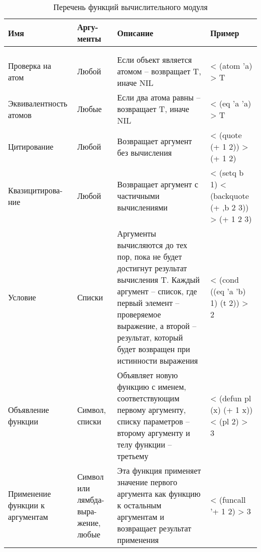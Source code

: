 \begin{xltabular}{\textwidth}{|p{3.6cm}|p{1.8cm}|p{6cm}|X|}
	\caption{Перечень функций вычислительного модуля\label{funcprimeval:table}}\\ \hline
	\centrow Имя & \centrow Аргу- \linebreak менты & \centrow Описание & \centrow Пример \\ \hline
	 &  &  &  \\ \hline
	\endfirsthead
	 &  &  &  \\ \hline
	\finishhead
	Проверка на атом & Любой & Если объект является атомом -- возвращает T, иначе NIL & < (atom 'a) \linebreak > T \\ \hline 
	Эквивалентность атомов & Любые & Если два атома равны -- возвращает T, иначе NIL & < (eq 'a 'a) \linebreak > T \\ \hline 
	Цитирование & Любой & Возвращает аргумент без вычисления & < (quote (+ 1 2)) \linebreak > (+ 1 2) \\ \hline 
	Квазицитирова-\linebreak ние & Любой & Возвращает аргумент с частичными вычислениями & < (setq b 1) \linebreak < (backquote (+ ,b 2 3)) \linebreak > (+ 1 2 3) \\ \hline 
	Условие & Списки & Аргументы вычисляются до тех пор, пока не будет достигнут результат вычисления T. Каждый аргумент -- список, где первый элемент -- проверяемое выражение, а второй -- результат, который будет возвращен при истинности выражения & < (cond ((eq 'a 'b) 1) (t 2)) \linebreak > 2 \\ \hline 
	Объявление функции & Символ, списки & Объявляет новую функцию с именем, соответствующим первому аргументу, списку параметров -- второму аргументу и телу функции -- третьему & < (defun pl (x) (+ 1 x)) \linebreak < (pl 2) \linebreak > 3 \\ \hline 
	Применение функции к аргументам & Символ или лямбда-выра- \linebreak жение, любые & Эта функция применяет значение первого аргумента как функцию к остальным аргументам и возвращает результат применения & < (funcall '+ 1 2) \linebreak > 3 \\ \hline 

\end{xltabular}

